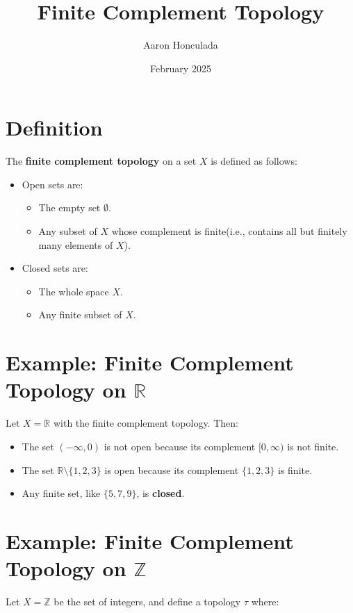 \documentclass{article}
\title{Finite Complement Topology}
\author{Aaron Honculada}
\date{February 2025}
\begin{document}
\maketitle

\section{Definition}

The \textbf{finite complement topology} on a set $X$ is defined as follows:

\begin{itemize}
    \item Open sets are:
    \begin{itemize}
        \item The empty set $\emptyset$.
        \item Any subset of $X$ whose complement is finite(i.e., contains all but finitely many elements of $X$).
    \end{itemize}
    \item Closed sets are:
    \begin{itemize}
        \item The whole space $X$.
        \item Any finite subset of $X$.
    \end{itemize}
\end{itemize}

\section{Example: Finite Complement Topology on $\mathbb{R}$}
Let $X=\mathbb{R}$ with the finite complement topology. Then:

\begin{itemize}
    \item The set $(-\infty, 0)$ is not open because its complement $[0, \infty)$ is not finite.
    \item The set $\mathbb{R}\setminus \{1,2,3\}$ is open because its complement $\{1,2,3\}$ is finite.
    \item Any finite set, like $\{5,7,9\}$, is \textbf{closed}.
\end{itemize}

\section{Example: Finite Complement Topology on $\mathbb{Z}$}
Let $X=\mathbb{Z}$ be the set of integers, and define a topology $\tau$ where:  
\end{document}
